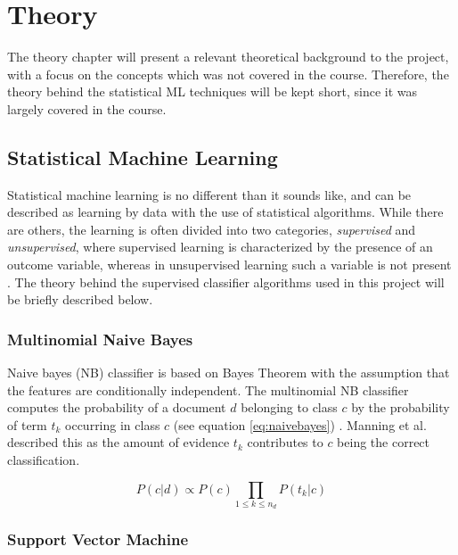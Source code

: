 \section{Theory}
\label{sec:theory}


The theory chapter will present a relevant theoretical background to the project, with a focus on the concepts which was not covered in the course. Therefore, the theory behind the statistical ML techniques will be kept short, since it was largely covered in the course.

\subsection{Statistical Machine Learning}

Statistical machine learning is no different than it sounds like, and can be described as learning by data with the use of statistical algorithms. While there are others, the learning is often divided into two categories, \textit{supervised} and \textit{unsupervised}, where supervised learning is characterized by the presence of an outcome variable, whereas in unsupervised learning such a variable is not present \cite{Hastie2009}. The theory behind the supervised classifier algorithms used in this project will be briefly described below.

\subsubsection{Multinomial Naive Bayes}

Naive bayes (NB) classifier is based on Bayes Theorem with the assumption that the features are conditionally independent. The multinomial NB classifier computes the probability of a document $d$ belonging to class $c$ by the probability of term $t_k$ occurring in class $c$ (see equation \ref{eq:naivebayes}) \cite{Manning2008}. Manning et al. described this as the amount of evidence $t_k$ contributes to $c$ being the correct classification.

\begin{equation}
\label{eq:naivebayes}
P(c|d) \propto P(c) \prod_{1 \leq k \leq n_d} P(t_k|c)
\end{equation}

\subsubsection{Support Vector Machine}

